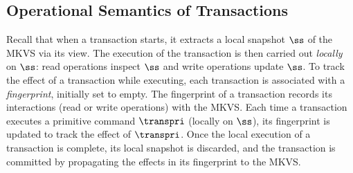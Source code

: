 
\subsection{Operational Semantics of Transactions}
\label{sec:trans-semantics}

Recall that when a transaction starts, it extracts a local snapshot $\ss$ of the MKVS via its view. 
The execution of the transaction is then carried out \emph{locally} on $\ss$:  
read operations inspect $\ss$ and write operations update $\ss$. 
To track the effect of a transaction while executing, each transaction is associated with a \emph{fingerprint}, initially set to empty. 
The fingerprint of a transaction records its interactions (read or write operations) with the MKVS.
Each time a transaction executes a primitive command \( \transpri\) (locally on $\ss$), its fingerprint is updated to track the effect of $\transpri$.
Once the local execution of a transaction is complete, its local snapshot is discarded, and the transaction is committed by propagating the effects in its fingerprint to the MKVS.
%


